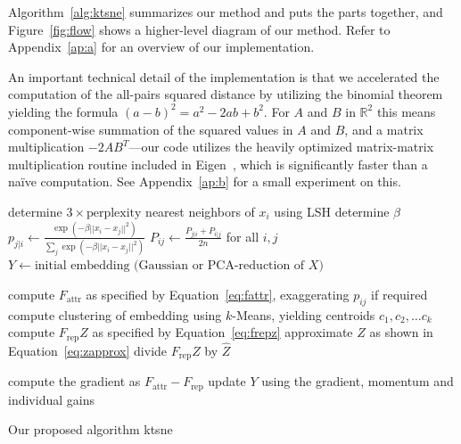 Algorithm~\ref{alg:ktsne} summarizes our method and puts the parts together,
and Figure~\ref{fig:flow} shows a higher-level diagram of our method. Refer to Appendix~\ref{ap:a}
for an overview of our implementation.

An important technical detail of the implementation is that we accelerated the
computation of the all-pairs squared distance by utilizing the binomial theorem
yielding the formula $(a - b)^2 = a^2 - 2ab + b^2$.  For $A$ and $B$ in
$\mathbb{R}^2$ this means component-wise summation of the squared values in $A$
and $B$, and a matrix multiplication $-2AB^T$---our code utilizes the heavily
optimized matrix-matrix multiplication routine included in
Eigen~\cite{eigenweb}, which is significantly faster than a na\"ive
computation. See Appendix~\ref{ap:b} for a small experiment on this.

\begin{algorithm}[tb]
    \begin{algorithmic}
       
          \State determine $3 \times \text{perplexity}$ nearest neighbors of $x_i$ using LSH
          \State determine $\beta$
          \State $p_{j | i} \gets \frac{\exp(-\beta ||x_i - x_j||^2)}{\sum_{j}\exp(-\beta ||x_i - x_j||^2)}$
          \EndFor
        \EndFor
        \State $P_{ij} \gets \frac{P_{j | i} + P_{i | j}}{2n}$ for all $i, j$ 
        \State $Y \gets \text{initial embedding (Gaussian or PCA-reduction of $X$)}$

        \Repeat {}

        \State compute $F_\text{attr}$ as specified by Equation~\ref{eq:fattr}, exaggerating $p_{ij}$ if required
        \EndFor
        \\
        \State compute clustering of embedding using $k$-Means, yielding centroids $c_1, c_2, \dots c_k$
        \State compute $F_\text{rep}Z$ as specified by Equation~\ref{eq:frepz}
        \State approximate $Z$ as shown in Equation~\ref{eq:zapprox}
        \State divide $F_\text{rep}Z$ by $\hat{Z}$

        \State compute the gradient as $F_\text{attr} - F_\text{rep}$
        \State update $Y$ using the gradient, momentum and individual gains

      \EndProcedure
    \end{algorithmic}
    \caption{Our proposed algorithm ktsne}
    \label{alg:ktsne}
\end{algorithm}

